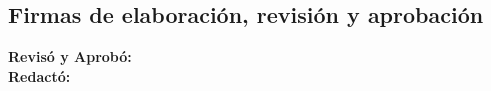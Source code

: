 


\subsection{Firmas de elaboración, revisión y aprobación}
	\textbf{Revisó y Aprobó: }\\
	\textbf{Redactó: }\\

